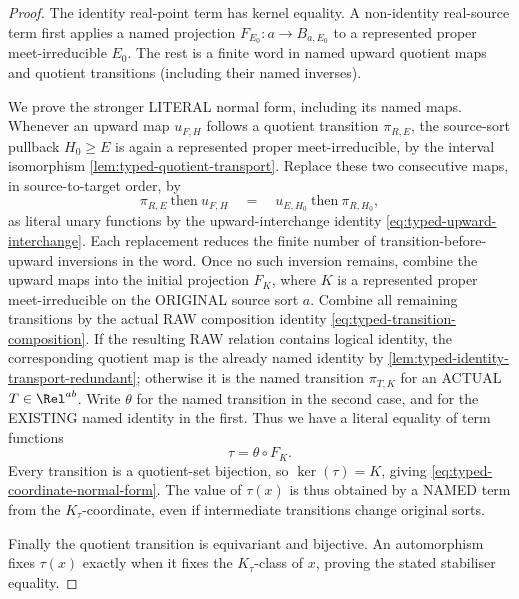 \begin{proof}
The identity real-point term has kernel equality.  A non-identity
real-source term first applies a named projection
\(F_{E_0}:a\to B_{a,E_0}\) to a represented proper
meet-irreducible \(E_0\).  The rest is a finite word in named
upward quotient maps and quotient transitions (including their
named inverses).

We prove the stronger LITERAL normal form, including its named maps.
Whenever an upward map \(u_{F,H}\) follows a quotient transition
\(\pi_{R,E}\), the source-sort pullback \(H_0\ge E\) is again a
represented proper meet-irreducible, by the interval isomorphism
\cref{lem:typed-quotient-transport}.  Replace these two
consecutive maps, in source-to-target order, by
\[
 \pi_{R,E}\ \text{then}\ u_{F,H}
 \quad=\quad
 u_{E,H_0}\ \text{then}\ \pi_{R,H_0},
\]
as literal unary functions by the upward-interchange identity
\eqref{eq:typed-upward-interchange}.  Each replacement reduces
the finite number of transition-before-upward inversions in
the word.  Once no such inversion remains, combine the
upward maps into the initial projection \(F_K\), where
\(K\) is a represented proper meet-irreducible on the
ORIGINAL source sort \(a\).  Combine all remaining
transitions by the actual RAW composition identity
\eqref{eq:typed-transition-composition}.  If the resulting
RAW relation contains logical identity, the corresponding
quotient map is the already named identity by
\cref{lem:typed-identity-transport-redundant};
otherwise it is the named transition \(\pi_{T,K}\) for
an ACTUAL \(T\in\Rel^{ab}\).  Write \(\theta\) for
the named transition in the second case, and for the
EXISTING named identity in the first.  Thus we have
a literal equality of term functions
\[
                       \tau=\theta\circ F_K.
\]
Every transition is a quotient-set bijection, so
\(\ker(\tau)=K\), giving \eqref{eq:typed-coordinate-normal-form}.
The value of \(\tau(x)\) is thus obtained by a NAMED
term from the \(K_\tau\)-coordinate, even if intermediate
transitions change original sorts.

Finally the quotient transition is equivariant and bijective.
An automorphism fixes \(\tau(x)\) exactly when it fixes the
\(K_\tau\)-class of \(x\), proving the stated stabiliser equality.
\end{proof}

